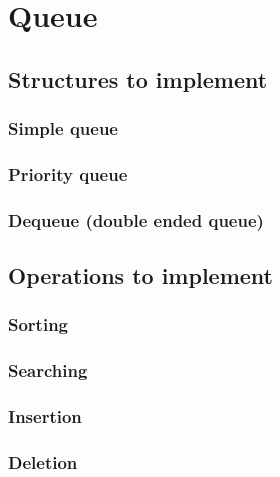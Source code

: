 \section{Queue}


\subsection{Structures to implement}

\subsubsection{Simple queue}

\subsubsection{Priority queue}

\subsubsection{Dequeue (double ended queue)}

\subsection{Operations to implement}

\subsubsection{Sorting}

\subsubsection{Searching}

\subsubsection{Insertion}

\subsubsection{Deletion}

\newpage
